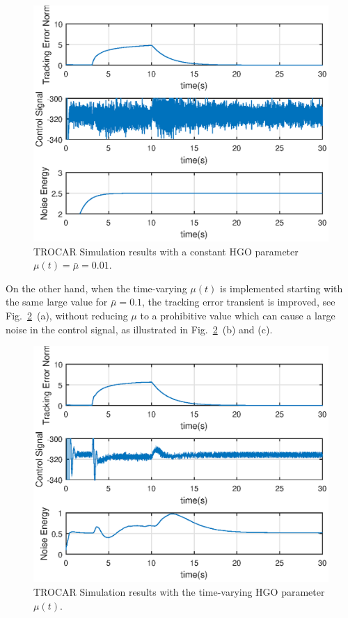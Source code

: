 \documentclass[letterpaper, 10 pt, journal, twocolumn]{IEEEtran}  %
\theoremstyle{plain}
\theoremstyle{definition}
\theoremstyle{remark}
\begin{document}
\begin{figure}[h!]
\begin{center}
\includegraphics[width = 13cm]{Figs/mu0dot01-30sec.eps}
\caption{TROCAR Simulation results with a constant HGO parameter $\mu(t)=\bar{\mu}\!=\!0.01$.}
\label{fig:timevarying2}
\end{center}
\end{figure}
%
On the other hand, when the time-varying $\mu(t)$ is implemented starting with the same large value for
$\bar{\mu}\!=\!0.1$,
the tracking error transient is improved, see Fig.~\ref{fig:timevarying3}~(a), without reducing $\mu$ to a prohibitive value which can cause a large noise in the control signal, as illustrated in Fig.~\ref{fig:timevarying3}~(b) and (c). 
%
\begin{figure}[h!]
\begin{center}
\includegraphics[width = 13cm]{Figs/muVar-30sec.eps}
\caption{TROCAR Simulation results with the time-varying HGO parameter $\mu(t)$.}
\label{fig:timevarying3}
\end{center}
\end{figure}
\end{document}
